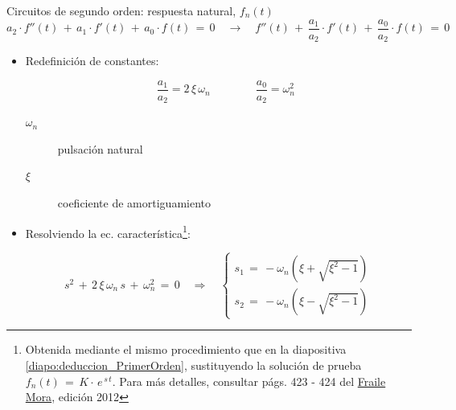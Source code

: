 \documentclass[aspectratio=169, usenames,svgnames,dvipsnames]{beamer}
\begin{document}
\begin{frame}{Circuitos de segundo orden: \hspace{3mm}respuesta natural, \hspace{3mm}$f_n(t)$} \label{diapo:ec_caracteristica}
	\begin{equation*}
	    a_2\cdot f''(t) \,+\, a_1\cdot f'(t) \,+\, a_0\cdot f(t) \,=\, 0 \quad\rightarrow\quad f''(t) \,+\, \dfrac{a_1}{a_2}\cdot f'(t) \,+\, \dfrac{a_0}{a_2}\cdot f(t) \,=\, 0
	\end{equation*}

    \vspace{-1mm}
	\begin{itemize}
	    \item Redefinición de constantes:

        \vspace{-3mm}
	    \begin{equation*}
    	    \quad\; {\dfrac{a_1}{a_2}=2\,\xi\,\omega_n}\qquad \qquad {\dfrac{a_0}{a_2}=\omega_n^2}
    	\end{equation*}

        \vspace{1mm}
    	\begin{description}
        	\item [$\omega_n \quad$] pulsación natural
            \vspace{1mm}
        	\item [$\xi \quad$] coeficiente de \alert{amortiguamiento}
    	\end{description}

        \setcounter{footnote}{0}
        
        \vspace{3mm}
    	\item Resolviendo la \alert{ec. característica}\footnote{Obtenida mediante el mismo procedimiento que en la diapositiva \ref{diapo:deduccion_PrimerOrden}, sustituyendo la solución de prueba $f_n(t) \,=\, K \cdot \, e^{\,s\,t}$. Para más detalles, consultar págs. 423 - 424 del \href{https://ingenio.upm.es/primo-explore/fulldisplay?docid=34UPM_ALMA2150534070004212\&context=L\&vid=34UPM_VU1\&lang=es_ES\&search_scope=TAB1_SCOPE1\&adaptor=Local\%20Search\%20Engine\&isFrbr=true\&tab=tab1\&query=any,contains,circuitos\%20electricos\%20fraile\%20mora\&sortby=date\&facet=frbrgroupid,include,578542795\&offset=0}{Fraile Mora}, edición 2012}:     
    
        \vspace{-5mm}
    	\begin{equation*}
    	    s^2 \,+\, 2\,\xi\,\omega_n\,s \,+\, \omega_n^2 \,=\, 0 \quad\Rightarrow\quad
    	    \begin{cases}
    	       s_1 \,=\, -\omega_n\left(\xi+\sqrt{\xi^2-1} \right)\\[9pt]
                s_2 \,=\, -\omega_n\left(\xi-\sqrt{\xi^2-1} \right)
    	    \end{cases}
    	\end{equation*}
	\end{itemize}
\end{frame}
\end{document}
